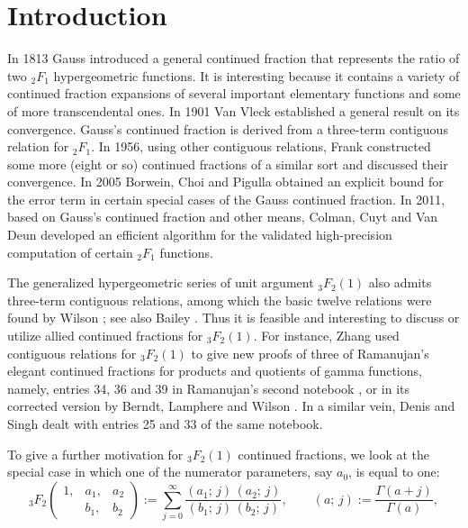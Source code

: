 \documentclass[a4paper,12pt]{article}
\theoremstyle{plain}
\def\vG{\varGamma}
\begin{document}
\section{Introduction} \label{sec:intro}
In 1813 Gauss \cite{Gauss} introduced a general continued fraction that represents  
the ratio of two ${}_2F_1$ hypergeometric functions. 
It is interesting because it contains a variety of continued fraction expansions of 
several important elementary functions and some of more transcendental ones.   
In 1901 Van Vleck \cite{VanVleck} established a general result on its convergence.   
Gauss's continued fraction is derived from a three-term contiguous relation for 
${}_2F_1$. 
In 1956, using other contiguous relations, Frank \cite{Frank} constructed some 
more (eight or so) continued fractions of a similar sort and discussed their 
convergence.  
In 2005 Borwein, Choi and Pigulla \cite{BCP} obtained an explicit bound for 
the error term in certain special cases of the Gauss continued fraction.   
In 2011, based on Gauss's continued fraction and other means, Colman, Cuyt 
and Van Deun \cite{CCD} developed an efficient algorithm for the validated 
high-precision computation of certain ${}_2F_1$ functions.    
\par
The generalized hypergeometric series of 
unit argument ${}_3F_2(1)$ also admits three-term contiguous relations, 
among which the  basic twelve relations were found by Wilson \cite{Wilson};  
see also Bailey \cite{Bailey2}.   
Thus it is feasible and interesting to discuss or utilize allied continued fractions 
for ${}_3F_2(1)$. 
For instance, Zhang \cite{Zhang} used contiguous relations for ${}_3F_2(1)$ 
to give new proofs of three of Ramanujan's elegant continued fractions for products 
and quotients of gamma functions, namely, entries 34, 36 and 39 in 
Ramanujan's second notebook \cite[Chapter 12]{Ramanujan}, or in its 
corrected version by Berndt, Lamphere and Wilson \cite{BLW}.    
In a similar vein, Denis and Singh \cite{DS}  dealt with entries 25 and 33 
of the same notebook.   
\par
To give a further motivation for ${}_3F_2(1)$ continued fractions, we look 
at the special case in which one of the numerator parameters, say $a_0$, 
is equal to one:   
\begin{equation} \label{eqn:3F2-i}
{}_3F_2\! 
\begin{pmatrix} 
1, & a_1, & a_2 \\ 
     & b_1, & b_2    
\end{pmatrix} := \sum_{j=0}^{\infty} 
\dfrac{(a_1; \, j) \, (a_2; \, j)}{(b_1; \, j) \, (b_2; \, j)},   
\qquad (a; \, j) := \dfrac{\vG( a+j )}{ \vG( a )},    
\end{equation}
\end{document}
